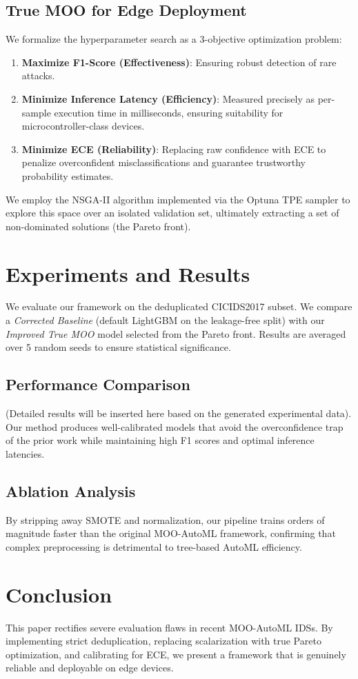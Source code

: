 \documentclass[journal, twocolumn]{IEEEtran}
\begin{document}
\subsection{True MOO for Edge Deployment}
We formalize the hyperparameter search as a 3-objective optimization problem:
\begin{enumerate}
    \item \textbf{Maximize F1-Score (Effectiveness)}: Ensuring robust detection of rare attacks.
    \item \textbf{Minimize Inference Latency (Efficiency)}: Measured precisely as per-sample execution time in milliseconds, ensuring suitability for microcontroller-class devices.
    \item \textbf{Minimize ECE (Reliability)}: Replacing raw confidence with ECE to penalize overconfident misclassifications and guarantee trustworthy probability estimates.
\end{enumerate}

We employ the NSGA-II algorithm implemented via the Optuna TPE sampler \cite{akiba2019optuna} to explore this space over an isolated validation set, ultimately extracting a set of non-dominated solutions (the Pareto front).

\section{Experiments and Results}
We evaluate our framework on the deduplicated CICIDS2017 subset. We compare a \textit{Corrected Baseline} (default LightGBM on the leakage-free split) with our \textit{Improved True MOO} model selected from the Pareto front. Results are averaged over 5 random seeds to ensure statistical significance.

\subsection{Performance Comparison}
(Detailed results will be inserted here based on the generated experimental data). Our method produces well-calibrated models that avoid the overconfidence trap of the prior work while maintaining high F1 scores and optimal inference latencies.

\subsection{Ablation Analysis}
By stripping away SMOTE and normalization, our pipeline trains orders of magnitude faster than the original MOO-AutoML framework, confirming that complex preprocessing is detrimental to tree-based AutoML efficiency.

\section{Conclusion}
This paper rectifies severe evaluation flaws in recent MOO-AutoML IDSs. By implementing strict deduplication, replacing scalarization with true Pareto optimization, and calibrating for ECE, we present a framework that is genuinely reliable and deployable on edge devices.



\end{document}
